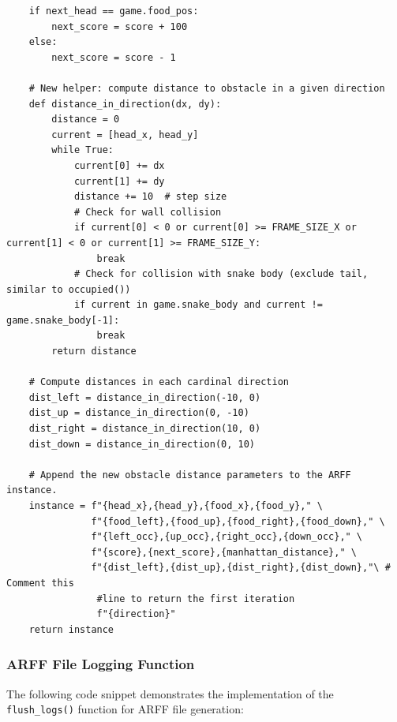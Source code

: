 \documentclass[12pt,a4paper]{article}
\begin{document}
\begin{verbatim}
    if next_head == game.food_pos:
        next_score = score + 100
    else:
        next_score = score - 1

    # New helper: compute distance to obstacle in a given direction
    def distance_in_direction(dx, dy):
        distance = 0
        current = [head_x, head_y]
        while True:
            current[0] += dx
            current[1] += dy
            distance += 10  # step size
            # Check for wall collision
            if current[0] < 0 or current[0] >= FRAME_SIZE_X or current[1] < 0 or current[1] >= FRAME_SIZE_Y:
                break
            # Check for collision with snake body (exclude tail, similar to occupied())
            if current in game.snake_body and current != game.snake_body[-1]:
                break
        return distance

    # Compute distances in each cardinal direction
    dist_left = distance_in_direction(-10, 0)
    dist_up = distance_in_direction(0, -10)
    dist_right = distance_in_direction(10, 0)
    dist_down = distance_in_direction(0, 10)

    # Append the new obstacle distance parameters to the ARFF instance.
    instance = f"{head_x},{head_y},{food_x},{food_y}," \
               f"{food_left},{food_up},{food_right},{food_down}," \
               f"{left_occ},{up_occ},{right_occ},{down_occ}," \
               f"{score},{next_score},{manhattan_distance}," \
               f"{dist_left},{dist_up},{dist_right},{dist_down},"\ # Comment this 
                #line to return the first iteration
                f"{direction}"
    return instance
\end{verbatim}

\subsubsection{ARFF File Logging Function}
\label{sec:arff-logging}
The following code snippet demonstrates the implementation of the \texttt{flush\_logs()} function for ARFF file generation:
\end{document}
